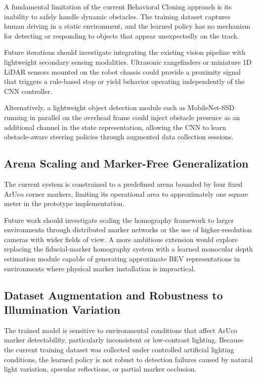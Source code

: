 A fundamental limitation of the current Behavioral Cloning approach is its inability to safely handle dynamic obstacles. The training dataset captures human driving in a static environment, and the learned policy has no mechanism for detecting or responding to objects that appear unexpectedly on the track.

Future iterations should investigate integrating the existing vision pipeline with lightweight secondary sensing modalities. Ultrasonic rangefinders or miniature 1D LiDAR sensors mounted on the robot chassis could provide a proximity signal that triggers a rule-based stop or yield behavior operating independently of the CNN controller.

Alternatively, a lightweight object detection module such as MobileNet-SSD running in parallel on the overhead frame could inject obstacle presence as an additional channel in the state representation, allowing the CNN to learn obstacle-aware steering policies through augmented data collection sessions.

\subsection{Arena Scaling and Marker-Free Generalization}

The current system is constrained to a predefined arena bounded by four fixed ArUco corner markers, limiting its operational area to approximately one square meter in the prototype implementation.

Future work should investigate scaling the homography framework to larger environments through distributed marker networks or the use of higher-resolution cameras with wider fields of view. A more ambitious extension would explore replacing the fiducial-marker homography system with a learned monocular depth estimation module capable of generating approximate BEV representations in environments where physical marker installation is impractical.

\subsection{Dataset Augmentation and Robustness to Illumination Variation}

The trained model is sensitive to environmental conditions that affect ArUco marker detectability, particularly inconsistent or low-contrast lighting. Because the current training dataset was collected under controlled artificial lighting conditions, the learned policy is not robust to detection failures caused by natural light variation, specular reflections, or partial marker occlusion.

